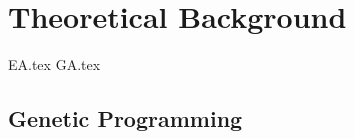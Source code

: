 \chapter{Theoretical Background}
\label{chap:theoretical_background}
  {EA.tex}
  {GA.tex}

  \section{Genetic Programming}
  \label{sec:genetic_programming}
    \Blindtext
